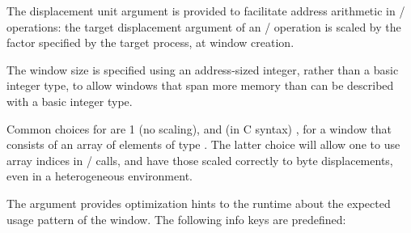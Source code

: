 The displacement unit argument
is provided to facilitate address arithmetic in \RMA/
operations: the target displacement argument of an \RMA/ operation is
scaled by the factor  specified by the target
process, at window creation.

\begin{rationale}
The window size is specified using an address-sized integer,
rather than a basic integer type, to allow windows that span more memory than
can be described with a basic integer type.
\end{rationale}

\begin{users}
Common choices for 
are 1 (no scaling), and (in C syntax) , for a
window that consists of an array of elements of type .  The
latter
choice will allow one to use array indices in \RMA/ calls,
and have those scaled correctly to byte displacements, even in a
heterogeneous environment.
\end{users}

The  argument provides
optimization hints to the runtime about the expected
usage pattern of the window.
The following info keys are predefined:

